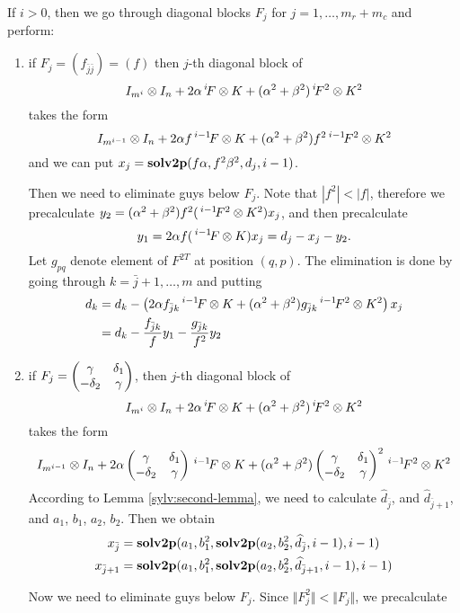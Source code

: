 \documentclass[11pt,a4paper]{article}
\begin{document}
If $i>0$, then we go through diagonal blocks $F_j$ for $j=1,\ldots, m_r+m_c$ 
and perform:
\begin{enumerate}
\item if $F_j=(f_{\bar j\bar j})=(f)$ then $j$-th diagonal block of 
$$
I_{m^i}\otimes I_n + 2\alpha\,^i\!F\otimes K +
(\alpha^2+\beta^2)\,^i\!F^2\otimes K^2
$$
takes the form
$$
I_{m^{i-1}}\otimes I_n +2\alpha f\,^{i-1}\!F\otimes K +
(\alpha^2+\beta^2)f^2\,^{i-1}\!F^2\otimes K^2
$$
and we can put $x_j = \mathbf{solv2p}(f\alpha,f^2\beta^2,d_j,i-1)$.

Then we need to eliminate guys below $F_j$. Note that $|f^2|<|f|$,
therefore we precalculate $y_2=(\alpha^2+\beta^2)f^2(\,^{i-1}\!F^2\otimes K^2)x_j$,
and then precalculate
$$y_1 = 2\alpha f(\,^{i-1}\!F\otimes K)x_j = d_j-x_j-y_2.$$
Let $g_{pq}$ denote element of $F^{2T}$ at position $(q,p)$. 
The elimination is done by going through $k=\bar j+1,\ldots, m$ and
putting
\begin{align*}
d_k &= d_k - \left(2\alpha f_{\bar j k}\,^{i-1}\!F\otimes K +
(\alpha^2+\beta^2)g_{\bar j k}\,^{i-1}\!F^2\otimes K^2\right)x_j\\
    &= d_k - \frac{f_{\bar j k}}{f}y_1 -
       \frac{g_{\bar j k}}{f^2}y_2
\end{align*}

\item if $F_j=\begin{pmatrix}\gamma&\delta_1\cr -\delta_2&\gamma\end{pmatrix}$,
then $j$-th diagonal block of
$$
I_{m^i}\otimes I_n + 2\alpha\,^i\!F\otimes K +
(\alpha^2+\beta^2)\,^i\!F^2\otimes K^2
$$
takes the form
$$
I_{m^{i-1}}\otimes I_n +2\alpha
\begin{pmatrix}\gamma&\delta_1\cr -\delta_2&\gamma\end{pmatrix}\,^{i-1}\!F\otimes K
+(\alpha^2+\beta^2)
\begin{pmatrix}\gamma&\delta_1\cr -\delta_2&\gamma\end{pmatrix}^2\,^{i-1}\!F^2\otimes K^2
$$
According to Lemma \ref{sylv:second-lemma}, we need to calculate
$\widehat{d}_{\bar j}$, and $\widehat{d}_{\bar j+1}$, and $a_1$,
$b_1$, $a_2$, $b_2$. Then we obtain
\begin{align*}
x_{\bar j}&=
 \mathbf{solv2p}(a_1,b_1^2,\mathbf{solv2p}(a_2,b_2^2,\widehat{d}_{\bar j},i-1),i-1)\\
x_{\bar j+1}&=
 \mathbf{solv2p}(a_1,b_1^2,\mathbf{solv2p}(a_2,b_2^2,\widehat{d}_{\bar j+1},i-1),i-1)
\end{align*}

Now we need to eliminate guys below $F_j$. Since $\Vert F^2_j\Vert <
\Vert F_j\Vert$, we precalculate 


\end{enumerate}
\end{document}
